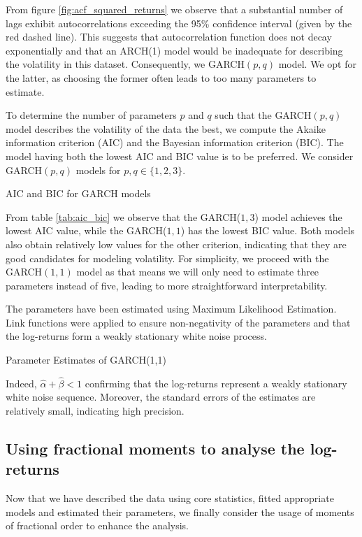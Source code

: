 From figure \ref{fig:acf_squared_returns} we observe that a substantial number of lags exhibit autocorrelations exceeding the 95\% confidence interval (given by the red dashed line). This suggests that autocorrelation function does not decay exponentially and that an ARCH(1) model would be inadequate for describing the volatility in this dataset. Consequently, we GARCH\((p, q)\) model. We opt for the latter, as choosing the former often leads to too many parameters to estimate.

To determine the number of parameters \(p\) and \(q\) such that the GARCH\((p,q)\) model describes the volatility of the data the best, we compute the Akaike information criterion (AIC) and the Bayesian information criterion (BIC). The model having both the lowest AIC and BIC value is to be preferred. We consider GARCH\((p, q)\) models for \(p, q \in \{1, 2, 3\}\).

\begin{table}[H]
    \centering

\caption{AIC and BIC for GARCH models} 
\label{tab:aic_bic}
\end{table}

From table \ref{tab:aic_bic} we observe that the GARCH(\(1, 3\)) model achieves the lowest AIC value, while the GARCH(\(1, 1\)) has the lowest BIC value. Both models also obtain relatively low values for the other criterion, indicating that they are good candidates for modeling volatility. For simplicity, we proceed with the GARCH\((1, 1)\) model as that means we will only need to estimate three parameters instead of five, leading to more straightforward interpretability.

The parameters have been estimated using Maximum Likelihood Estimation. Link functions were applied to ensure non-negativity of the parameters and that the log-returns form a weakly stationary white noise process.

\begin{table}[H]
    \centering

\caption{Parameter Estimates of GARCH(1,1)} 
\label{tab:parameter_estimates}
\end{table}

Indeed, \(\hat{\alpha} + \hat{\beta} < 1\) confirming that the log-returns represent a weakly stationary white noise sequence. Moreover, the standard errors of the estimates are relatively small, indicating high precision.


\subsection{Using fractional moments to analyse the log-returns}
Now that we have described the data using core statistics, fitted appropriate models and estimated their parameters, we finally consider the usage of moments of fractional order to enhance the analysis.
